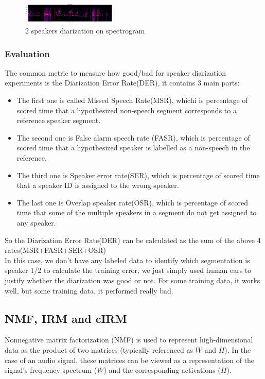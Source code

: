 \documentclass[journal, a4paper]{IEEEtran}
\begin{document}
\begin{figure}[h!]
    \centering  
     \caption{\label{Fig:speaker diarization 2}2 speakers diarization on spectrogram}  
    \includegraphics[width=0.4\textwidth]{kmeans02.png}
\end{figure}
\subsubsection{Evaluation\cite{Segmentation}}The common metric to measure how good/bad for speaker diarization experiments is the Diarization Error Rate(DER), it contains 3 main parts:
\begin{itemize}
    \item The first one is called Missed Speech Rate(MSR), whichi is percentage of scored time that a hypothesized non-speech segment corresponds to a reference speaker segment.
    \item The second one is False alarm speech rate (FASR), which is percentage of scored time that a hypothesized speaker is labelled as a non-speech in the reference.
    \item The third one is Speaker error rate(SER), which is percentage of scored time that a speaker ID is assigned to the wrong speaker.
    \item The last one is Overlap speaker rate(OSR), which is percentage of scored time that some of the multiple speakers in a segment do not get assigned to any speaker.
\end{itemize}

So the Diarization Error Rate(DER) can be calculated as the sum of the above 4 rates(MSR+FASR+SER+OSR)\\
In this case, we don't have any labeled data to identify which segmentation is speaker 1/2 to calculate the training error, we just simply used human ears to justify whether the diarization was good or not. For some training data, it works well, but some training data, it performed really bad. 

\subsection{NMF, IRM and cIRM}
Nonnegative matrix factorization (NMF) is used to represent high-dimensional data as the product of two matrices (typically referenced as $W$ and $H$). In the case of an audio signal, these matrices can be viewed as a representation of the signal's frequency spectrum ($W$) and the corresponding activations ($H$).
\end{document}
